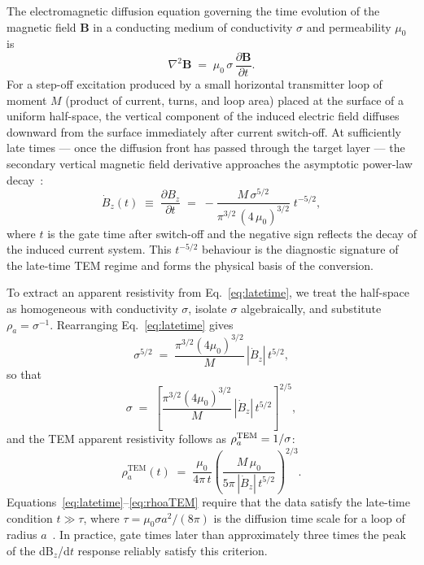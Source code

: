 \documentclass[review,12pt]{elsarticle}
\begin{document}
The electromagnetic diffusion equation governing the time evolution of the
magnetic field $\mathbf{B}$ in a conducting medium of conductivity $\sigma$
and permeability $\mu_0$ is
\begin{equation}
  \nabla^2\mathbf{B} \;=\; \mu_0\,\sigma\,\frac{\partial\mathbf{B}}{\partial t}.
  \label{eq:diffusion}
\end{equation}
For a step-off excitation produced by a small horizontal transmitter loop
of moment $M$ (product of current, turns, and loop area) placed at the
surface of a uniform half-space, the vertical component of the induced
electric field diffuses downward from the surface immediately after
current switch-off.
At sufficiently late times — once the diffusion front has passed through
the target layer — the secondary vertical magnetic field derivative
approaches the asymptotic power-law decay~\citep{WardHohmann1988,NabighianMacnae1991}:
\begin{equation}
  \dot{B}_z(t) \;\equiv\;
  \frac{\partial B_z}{\partial t} \;=\;
  -\frac{M\,\sigma^{5/2}}{\pi^{3/2}\,(4\,\mu_0)^{3/2}}\;t^{-5/2},
  \label{eq:latetime}
\end{equation}
where $t$ is the gate time after switch-off and the negative sign reflects
the decay of the induced current system.
This $t^{-5/2}$ behaviour is the diagnostic signature of the late-time
TEM regime and forms the physical basis of the conversion.

To extract an apparent resistivity from Eq.~\eqref{eq:latetime}, we treat
the half-space as homogeneous with conductivity $\sigma$, isolate $\sigma$
algebraically, and substitute $\rho_a = \sigma^{-1}$.
Rearranging Eq.~\eqref{eq:latetime} gives
\begin{equation}
  \sigma^{5/2} \;=\; \frac{\pi^{3/2}(4\mu_0)^{3/2}}{M}\,|\dot{B}_z|\,t^{5/2},
  \label{eq:sigma52}
\end{equation}
so that
\begin{equation}
  \sigma \;=\; \left[\frac{\pi^{3/2}(4\mu_0)^{3/2}}{M}
               \,|\dot{B}_z|\,t^{5/2}\right]^{2/5}\!,
  \label{eq:sigma}
\end{equation}
and the TEM apparent resistivity follows as $\rho_a^{\rm TEM}=1/\sigma$:
\begin{equation}
  \rho_a^{\mathrm{TEM}}(t) \;=\;
  \frac{\mu_0}{4\pi\,t}
  \left(\frac{M\,\mu_0}{5\pi\,|\dot{B}_z|\,t^{5/2}}\right)^{\!2/3}\!.
  \label{eq:rhoaTEM}
\end{equation}
Equations~\eqref{eq:latetime}--\eqref{eq:rhoaTEM} require that the data
satisfy the late-time condition $t \gg \tau$, where
$\tau = \mu_0\sigma a^2/(8\pi)$ is the diffusion time scale for a loop of
radius $a$~\citep{NabighianMacnae1991}.
In practice, gate times later than approximately three times the peak
of the dB$_z$/d$t$ response reliably satisfy this criterion.
\end{document}
